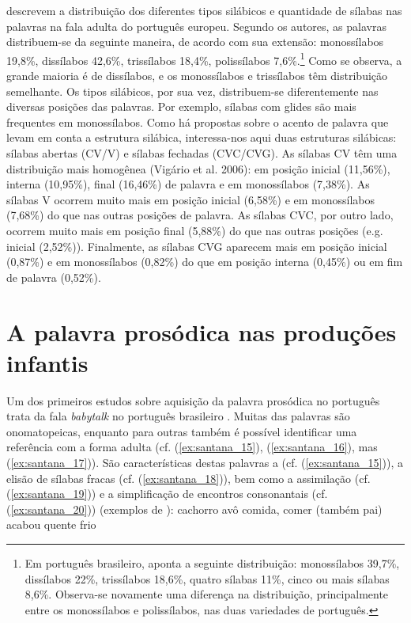\documentclass[output=paper]{LSP/langsci}
\begin{document}
\citet{vigario_etal2006} descrevem a distribuição dos diferentes tipos silábicos e quantidade de sílabas nas palavras na fala adulta do português europeu. Segundo os autores, as palavras distribuem-se da seguinte maneira, de acordo com sua extensão: monossílabos 19,8\%, dissílabos 42,6\%, trissílabos 18,4\%, polissílabos 7,6\%.\footnote{Em português brasileiro, \citet{cintra1997} aponta a seguinte distribuição: monossílabos 39,7\%, dissílabos 22\%, trissílabos 18,6\%, quatro sílabas 11\%, cinco ou mais sílabas 8,6\%. Observa-se novamente uma diferença na distribuição, principalmente entre os monossílabos e polissílabos, nas duas variedades de português.} Como se observa, a grande maioria é de dissílabos, e os monossílabos e trissílabos têm distribuição semelhante. Os tipos silábicos, por sua vez, distribuem-se diferentemente nas diversas posições das palavras. Por exemplo, sílabas com glides são mais frequentes em monossílabos. Como há propostas sobre o acento de palavra que levam em conta a estrutura silábica, interessa-nos aqui duas estruturas silábicas: sílabas abertas (CV/V) e sílabas fechadas (CVC/CVG). As sílabas CV têm uma distribuição mais homogênea (Vigário et al. 2006): em posição inicial (11,56\%), interna (10,95\%), final (16,46\%) de palavra e em monossílabos (7,38\%). As sílabas V ocorrem muito mais em posição inicial (6,58\%) e em monossílabos (7,68\%) do que nas outras posições de palavra. As sílabas CVC, por outro lado, ocorrem muito mais em posição final (5,88\%) do que nas outras posições (e.g. inicial (2,52\%)). Finalmente, as sílabas CVG aparecem mais em posição inicial (0,87\%) e em monossílabos (0,82\%) do que em posição interna (0,45\%) ou em fim de palavra (0,52\%).

\section{A palavra prosódica nas produções infantis}
\label{sec:santana_palavra_prosodica_infantis}

Um dos primeiros estudos sobre aquisição da palavra prosódica no português trata da fala \textit{babytalk} no português brasileiro \citep{stoelgammon1976}. Muitas das palavras são onomatopeicas, enquanto para outras também é possível identificar uma referência com a forma adulta (cf. (\ref{ex:santana_15}), (\ref{ex:santana_16}), mas (\ref{ex:santana_17})). São características destas palavras a  (cf. (\ref{ex:santana_15})), a elisão de sílabas fracas (cf. (\ref{ex:santana_18})), bem como a assimilação (cf. (\ref{ex:santana_19})) e a simplificação de encontros consonantais (cf. (\ref{ex:santana_20})) (exemplos de \citealt{stoelgammon1976}):
\ea\label{ex:santana_15}\ipa{[uaw.aw]} cachorro\z
\ea\label{ex:santana_16}\ipa{[vo\pstr vo]} avô\z
\ea\label{ex:santana_17}\ipa{[pa\pstr pa]} comida, comer (também pai)\z
\ea\label{ex:santana_18}\ipa{[a.\pstr bo]} acabou\z
\ea\label{ex:santana_19}\ipa{[\pstr t\~{e}.te]} quente\z
\ea\label{ex:santana_20}\ipa{[fiw]} frio\z
\end{document}
